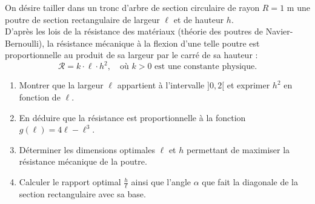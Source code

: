 \documentclass[11pt,a4paper]{article}
\begin{document}
On désire tailler dans un tronc d'arbre de section circulaire de rayon $R = 1\text{ m}$ une poutre de section rectangulaire de largeur $\ell$ et de hauteur $h$.\\
D'après les lois de la résistance des matériaux (théorie des poutres de Navier-Bernoulli), la résistance mécanique à la flexion d'une telle poutre est proportionnelle au produit de sa largeur par le carré de sa hauteur :
\[
\mathcal{R} = k \cdot \ell \cdot h^2, \quad \text{où } k > 0 \text{ est une constante physique}.
\]
\begin{enumerate}[label=\textbf{\arabic*.}]
    \item Montrer que la largeur $\ell$ appartient à l'intervalle $]0, 2[$ et exprimer $h^2$ en fonction de $\ell$.
    \item En déduire que la résistance est proportionnelle à la fonction $g(\ell) = 4\ell - \ell^3$.
    \item Déterminer les dimensions optimales $\ell$ et $h$ permettant de maximiser la résistance mécanique de la poutre.
    \item Calculer le rapport optimal $\frac{h}{\ell}$ ainsi que l'angle $\alpha$ que fait la diagonale de la section rectangulaire avec sa base.
\end{enumerate}
\end{document}

